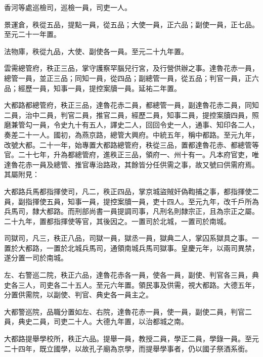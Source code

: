 \begin{pinyinscope}
 香河等處巡檢司，巡檢一員，司吏一人。



 景運倉，秩從五品，提點一員，從五品；大使一員，正六品；副使一員，正七品。至元二十一年置。



 法物庫，秩從九品，大使、副使各一員。至元二十九年置。



 雲需總管府，秩正三品，掌守護察罕腦兒行宮，及行營供辦之事。達魯花赤一員，總管一員，並正三品；同知一員，從四品；副總管一員，從五品；判官一員，正六品；經歷一員，知事一員，提控案牘一員。延祐二年置。



 大都路都總管府，秩正三品，達魯花赤二員，都總管一員，副達魯花赤二員，同知二員，治中二員，判官二員，推官二員，經歷二員，知事二員，提控案牘四員，照磨兼管勾一員，令史九十有五人，譯史二人，回回令史一人，通事、知印各二人，奏差二十一人。國初，為燕京路，總管大興府。中統五年，稱中都路。至元九年，改號大都。二十一年，始專置大都路總管府，秩從三品，置都達魯花赤、都總管等官。二十七年，升為都總管府，進秩正三品，領府一、州十有一。凡本府官吏，唯達魯花赤一員及總管、推官專治路政，其餘皆分任供需之事，故又號曰供需府焉。其屬附見：



 大都路兵馬都指揮使司，凡二，秩正四品，掌京城盜賊奸偽鞫捕之事，都指揮使二員，副指揮使五員，知事一員，提控案牘一員，吏十四人。至元九年，改千戶所為兵馬司，隸大都路。而刑部尚書一員提調司事，凡刑名則隸宗正，且為宗正之屬。二十九年，置都指揮使等官，其後因之。一置司於北城，一置司於南城。



 司獄司，凡三，秩正八品，司獄一員，獄丞一員，獄典二人，掌囚系獄具之事。一置於大都路，一置於北城兵馬司，通領南城兵馬司獄事。皇慶元年，以兩司異禁，遂分置一司於南城。



 左、右警巡二院，秩正六品，達魯花赤各一員，使各一員，副使、判官各三員，典史各三人，司吏各二十五人。至元六年置。領民事及供需，視大都路。大德五年，分置供需院，以副使、判官、典史各一員主之。



 大都警巡院，品職分置如左、右院，達魯花赤一員，使一員，副使二員，判官二員，典史二員，司吏二十人。大德九年置，以治都城之南。



 大都路提舉學校所，秩正六品。提舉一員，教授二員，學正二員，學錄一員。至元二十四年，既立國學，以故孔子廟為京學，而提舉學事者，仍以國子祭酒系銜。




\end{pinyinscope}
